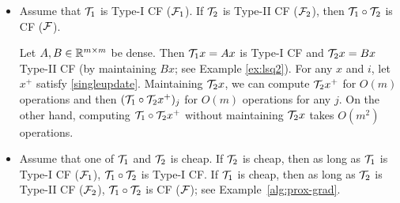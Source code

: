 \begin{itemize}
\item Assume that ${\mathcal{T}}_1$ is Type-I CF (${\mathcal{F}}_1$). If ${\mathcal{T}}_2$ is Type-II CF (${\mathcal{F}}_2$), then ${\mathcal{T}}_1\circ{\mathcal{T}}_2$ is CF (${\mathcal{F}}$).
\begin{example}\label{den-den}
Let $A,B\in\mathbb{R}^{m\times m}$ be dense. Then ${\mathcal{T}}_1 x=Ax$ is Type-I CF and ${\mathcal{T}}_2 x=Bx$ Type-II CF (by maintaining $Bx$; see {Example \ref{ex:lsq2}}). For any $x$ and $i$, let $x^+$ satisfy \eqref{singleupdate}. Maintaining ${\mathcal{T}}_2 x$, we can compute ${\mathcal{T}}_2 x^+$ for $O(m)$ operations and then $({\mathcal{T}}_1\circ{\mathcal{T}}_2 x^+)_j$ for $O(m)$ operations for any $j$. On the other hand, computing ${\mathcal{T}}_1\circ{\mathcal{T}}_2 x^+$ without maintaining ${\mathcal{T}}_2 x$ takes $O(m^2)$ operations. 
\end{example}


\item Assume that one of ${\mathcal{T}}_1$ and ${\mathcal{T}}_2$ is cheap. If ${\mathcal{T}}_2$ is cheap, then as long as ${\mathcal{T}}_1$ is Type-I CF (${\mathcal{F}}_1$), ${\mathcal{T}}_1\circ {\mathcal{T}}_2$ is Type-I CF. If ${\mathcal{T}}_1$ is cheap, then as long as ${\mathcal{T}}_2$ is Type-II CF (${\mathcal{F}}_2$), ${\mathcal{T}}_1\circ {\mathcal{T}}_2$ is CF (${\mathcal{F}}$); see Example~\ref{alg:prox-grad}.
\end{itemize}

